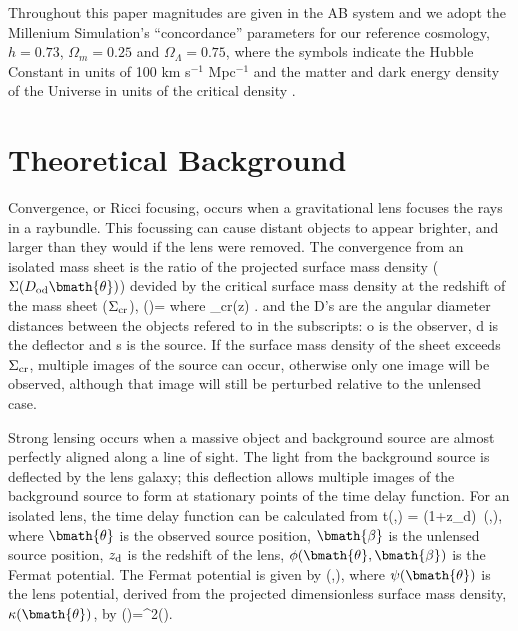 \documentclass[useAMS,usenatbib]{mn2e}
\begin{document}
Throughout this paper magnitudes are given in the AB system \citep{Oke74} and
we adopt the Millenium Simulation's ``concordance'' parameters for our reference cosmology, \ie
$h=0.73$, $\Omega_m=0.25$ and $\Omega_\Lambda=0.75$, where the symbols indicate
the Hubble Constant in units of 100 km s$^{-1}$ Mpc$^{-1}$ and the matter and
dark energy density of the Universe in units of the critical density
.%



\section{Theoretical Background}
\label{sec:theory}



Convergence, or Ricci focusing, occurs when a gravitational lens focuses the rays in a raybundle.
This focussing can cause distant objects to appear brighter, and larger than they would if the lens
 were removed.
The convergence from an isolated mass sheet is the ratio of the projected surface mass density
($\Sigma(D_{\mathrm{od}}\bmath{\theta})$) devided by the critical surface mass density at the redshift of the mass sheet ($\Sigma_{\rm cr}$),
\be
\kappa(\bmath{\theta})= 
\ee
where 
\be \label{eq:sigcrit} 
\Sigma_{\rm cr}(z) \equiv {}.
\ee
and the D's are the angular diameter distances between the objects refered to in the subscripts: o is the observer, d is the deflector and s is the source. If the surface mass density of the sheet exceeds $\Sigma_{\rm cr}$, multiple images of the source can
occur, otherwise only one image will be observed, although that image will still be perturbed
relative to the unlensed case.

Strong lensing occurs when a massive object and background source are almost perfectly
aligned along a line of sight. The light from the background source is deflected by the
lens galaxy; this deflection allows multiple images of the background source to form
at stationary points of the time delay function. For an isolated lens, the time delay
function can be calculated from
\be \label{eq:T} 
\Delta t(\bmath{\theta},\bmath{\beta}) =   (1+z_{\rm d})\, \phi(\bmath{\theta},\bmath{\beta}),
\ee
where $\bmath{\theta}$ is the observed source position, $\bmath{\beta}$ is the 
unlensed source position, $z_{\rm d}$ is the redshift of the lens, $\phi(\bmath{\theta},\bmath{\beta})$ is
the Fermat potential. The Fermat potential is given by
\be \label{eq:FP}
\phi(\bmath{\theta},\bmath{\beta})\equiv {}, 
\ee
where $\psi(\bmath{\theta})$ is the lens potential, derived from the projected dimensionless
surface mass density, $\kappa(\bmath{\theta})$, by 
\be \label{eq:psikappa}
\kappa(\bmath{\theta})=\nabla^2\psi(\bmath{\theta}).
\ee
\end{document}
